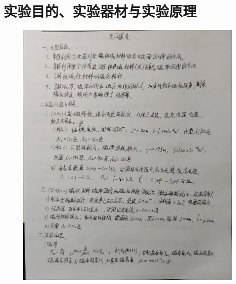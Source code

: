 \documentclass[11pt]{article}
\begin{document}
\section{实验目的、实验器材与实验原理}
    \begin{figure}[H]
        \centering
        \includegraphics[width=15.5cm]{Fig/1.jpg}
    \end{figure}
\end{document}
